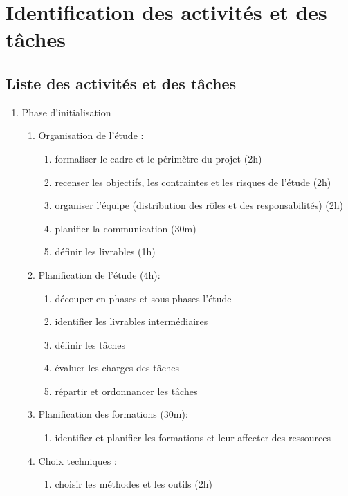 \chapter{Identification des activités et des tâches}

\section{Liste des activités et des tâches}

\begin{enumerate}
  \item Phase d'initialisation
          \begin{enumerate}
            \item Organisation de l'étude :
              \begin{enumerate}
                  \item formaliser le cadre et le périmètre du projet (2h)
                  \item  recenser les objectifs, les contraintes et les risques de l'étude (2h)
                  \item  organiser l'équipe (distribution des rôles et des responsabilités) (2h)
                  \item  planifier la communication (30m)
                  \item  définir les livrables (1h)
              \end{enumerate}
            \item Planification de l'étude (4h): 
              \begin{enumerate}
                  \item  découper en phases et sous-phases l'étude 
                  \item  identifier les livrables intermédiaires 
                  \item  définir les tâches 
                  \item  évaluer les charges des tâches 
                  \item  répartir et ordonnancer les tâches 
              \end{enumerate}

            \item Planification des formations (30m):
                \begin{enumerate}
                  \item identifier et planifier les formations et leur affecter des ressources
                \end{enumerate}
            \item Choix techniques : 
                \begin{enumerate}
                  \item choisir les méthodes et les outils (2h)
                \end{enumerate}


\end{enumerate}
\end{enumerate}
